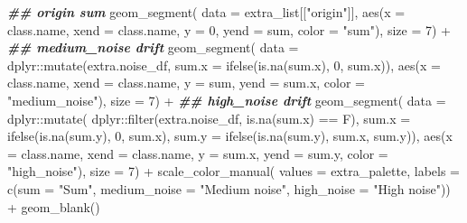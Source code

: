 \documentclass[
]{article}
\newenvironment{Shaded}{\begin{snugshade}}{\end{snugshade}}
\newcommand{\AttributeTok}[1]{\textcolor[rgb]{0.77,0.63,0.00}{#1}}
\newcommand{\DecValTok}[1]{\textcolor[rgb]{0.00,0.00,0.81}{#1}}
\newcommand{\DocumentationTok}[1]{\textcolor[rgb]{0.56,0.35,0.01}{\textbf{\textit{#1}}}}
\newcommand{\FunctionTok}[1]{\textcolor[rgb]{0.00,0.00,0.00}{#1}}
\newcommand{\NormalTok}[1]{#1}
\newcommand{\SpecialCharTok}[1]{\textcolor[rgb]{0.00,0.00,0.00}{#1}}
\newcommand{\StringTok}[1]{\textcolor[rgb]{0.31,0.60,0.02}{#1}}
\begin{document}
\begin{Shaded}
\begin{Highlighting}[]
      \DocumentationTok{\#\# origin sum}
      \FunctionTok{geom\_segment}\NormalTok{(}
        \AttributeTok{data =}\NormalTok{ extra\_list[[}\StringTok{"origin"}\NormalTok{]],}
        \FunctionTok{aes}\NormalTok{(}\AttributeTok{x =}\NormalTok{ class.name, }\AttributeTok{xend =}\NormalTok{ class.name, }\AttributeTok{y =} \DecValTok{0}\NormalTok{, }\AttributeTok{yend =}\NormalTok{ sum, }\AttributeTok{color =} \StringTok{"sum"}\NormalTok{),}
        \AttributeTok{size =} \DecValTok{7}\NormalTok{) }\SpecialCharTok{+}
      \DocumentationTok{\#\# medium\_noise drift}
      \FunctionTok{geom\_segment}\NormalTok{(}
        \AttributeTok{data =}\NormalTok{ dplyr}\SpecialCharTok{::}\FunctionTok{mutate}\NormalTok{(extra.noise\_df, }\AttributeTok{sum.x =} \FunctionTok{ifelse}\NormalTok{(}\FunctionTok{is.na}\NormalTok{(sum.x), }\DecValTok{0}\NormalTok{, sum.x)),}
        \FunctionTok{aes}\NormalTok{(}\AttributeTok{x =}\NormalTok{ class.name, }\AttributeTok{xend =}\NormalTok{ class.name, }\AttributeTok{y =}\NormalTok{ sum, }\AttributeTok{yend =}\NormalTok{ sum.x, }\AttributeTok{color =} \StringTok{"medium\_noise"}\NormalTok{),}
        \AttributeTok{size =} \DecValTok{7}\NormalTok{) }\SpecialCharTok{+}
      \DocumentationTok{\#\# high\_noise drift}
      \FunctionTok{geom\_segment}\NormalTok{(}
        \AttributeTok{data =}\NormalTok{ dplyr}\SpecialCharTok{::}\FunctionTok{mutate}\NormalTok{(}
\NormalTok{          dplyr}\SpecialCharTok{::}\FunctionTok{filter}\NormalTok{(extra.noise\_df, }\FunctionTok{is.na}\NormalTok{(sum.x) }\SpecialCharTok{==}\NormalTok{ F),}
          \AttributeTok{sum.x =} \FunctionTok{ifelse}\NormalTok{(}\FunctionTok{is.na}\NormalTok{(sum.y), }\DecValTok{0}\NormalTok{, sum.x),}
          \AttributeTok{sum.y =} \FunctionTok{ifelse}\NormalTok{(}\FunctionTok{is.na}\NormalTok{(sum.y), sum.x, sum.y)),}
        \FunctionTok{aes}\NormalTok{(}\AttributeTok{x =}\NormalTok{ class.name, }\AttributeTok{xend =}\NormalTok{ class.name, }\AttributeTok{y =}\NormalTok{ sum.x, }\AttributeTok{yend =}\NormalTok{ sum.y, }\AttributeTok{color =} \StringTok{"high\_noise"}\NormalTok{),}
        \AttributeTok{size =} \DecValTok{7}\NormalTok{) }\SpecialCharTok{+}
      \FunctionTok{scale\_color\_manual}\NormalTok{(}
        \AttributeTok{values =}\NormalTok{ extra\_palette,}
        \AttributeTok{labels =} \FunctionTok{c}\NormalTok{(}\AttributeTok{sum =} \StringTok{"Sum"}\NormalTok{, }\AttributeTok{medium\_noise =} \StringTok{"Medium noise"}\NormalTok{, }\AttributeTok{high\_noise =} \StringTok{"High noise"}\NormalTok{)) }\SpecialCharTok{+}
      \FunctionTok{geom\_blank}\NormalTok{()}

\end{Highlighting}
\end{Shaded}
\end{document}
